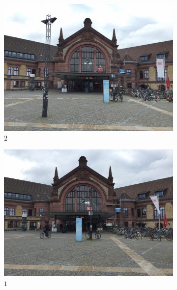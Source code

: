 \begin{figure}[h]
   \begin{subfigure}{.33\textwidth}
      \includegraphics[width=\textwidth]{gfx/bahnhof_imgs/3.JPG}
      \caption{$2$}
   \end{subfigure}
   \begin{subfigure}{.33\textwidth}
      \includegraphics[width=\textwidth]{gfx/bahnhof_imgs/2.JPG}
      \caption{$1$}
   \end{subfigure}
   \begin{subfigure}{.33\textwidth}

\end{subfigure}
\end{figure}
